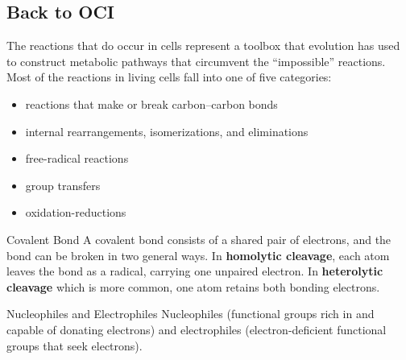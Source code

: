 \documentclass[../main.tex]{subfiles}
\begin{document}
\subsection{Back to OCI}
The reactions that do occur in cells represent a toolbox 
that evolution has used to construct metabolic pathways 
that circumvent the “impossible” reactions. Most of the reactions in living cells fall into one of five categories: 
\begin{itemize}
	\item reactions that make or break carbon–carbon bonds
	\item internal rearrangements, isomerizations, and eliminations
	\item free-radical reactions
	\item group transfers
	\item oxidation-reductions
\end{itemize}
\begin{RemarkWithTitel}{Covalent Bond}
	A covalent bond consists of a shared pair of electrons, and the bond can be broken in two general ways. In \textbf{homolytic cleavage}, each atom leaves the bond as a radical, carrying one unpaired electron. In \textbf{heterolytic cleavage} which is more common, one atom retains both bonding 
	electrons. 
\end{RemarkWithTitel}
\begin{RemarkWithTitel}{Nucleophiles and Electrophiles}
	Nucleophiles (functional groups rich in and capable of donating electrons) and electrophiles (electron-deficient functional groups that seek electrons).
\end{RemarkWithTitel}
\end{document}
